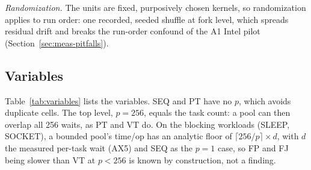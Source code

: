 \emph{Randomization.} The units are fixed, purposively chosen kernels, so randomization applies to run order: one recorded, seeded shuffle at fork level, which spreads residual drift and breaks the run-order confound of the A1 Intel pilot (Section~\ref{sec:meas-pitfalls}).

\subsection{Variables}\label{sec:planning-variables}
Table~\ref{tab:variables} lists the variables. SEQ and PT have no $p$, which avoids duplicate cells. The top level, $p = 256$, equals the task count: a pool can then overlap all 256 waits, as PT and VT do. On the blocking workloads (SLEEP, SOCKET), a bounded pool's time/op has an analytic floor of $\lceil 256/p \rceil \times d$, with $d$ the measured per-task wait (AX5) and SEQ as the $p = 1$ case, so FP and FJ being slower than VT at $p < 256$ is known by construction, not a finding.

